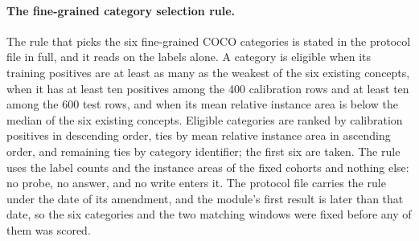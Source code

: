 \FloatBarrier

\paragraph{The fine-grained category selection rule.} The rule that picks the six fine-grained COCO categories is stated in the protocol file in full, and it reads on the labels alone. A category is eligible when its training positives are at least as many as the weakest of the six existing concepts, when it has at least ten positives among the 400 calibration rows and at least ten among the 600 test rows, and when its mean relative instance area is below the median of the six existing concepts. Eligible categories are ranked by calibration positives in descending order, ties by mean relative instance area in ascending order, and remaining ties by category identifier; the first six are taken. The rule uses the label counts and the instance areas of the fixed cohorts and nothing else: no probe, no answer, and no write enters it. The protocol file carries the rule under the date of its amendment, and the module's first result is later than that date, so the six categories and the two matching windows were fixed before any of them was scored.
